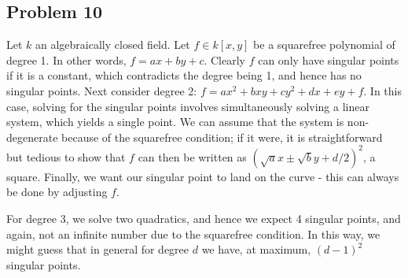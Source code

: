 \documentclass{../../mathnotes}
\begin{document}
\subsection*{Problem 10}

Let $k$ an algebraically closed field. Let $f\in k[x,y]$ be a squarefree polynomial of degree 1. In other words, $f=ax+by+c$.
Clearly $f$ can only have singular points if it is a constant, which contradicts the degree being 1, and hence has no singular points.
Next consider degree 2: $f=ax^2+bxy+cy^2+dx+ey+f$. In this case, solving for the singular points involves simultaneously solving a linear
system, which yields a single point. We can assume that the system is non-degenerate because of the squarefree condition; if it were, it is
straightforward but tedious to show that $f$ can then be written as $(\sqrt{a}x\pm\sqrt{b}y+d/2)^2$, a square. Finally, we want our singular point
to land on the curve - this can always be done by adjusting $f$.

For degree 3, we solve two quadratics, and hence we expect 4 singular points, and again, not an infinite number due to the squarefree condition. In this way, we might
guess that in general for degree $d$ we have, at maximum, $(d-1)^2$ singular points.
\end{document}
